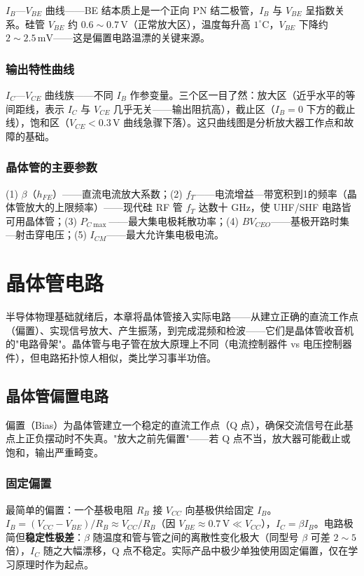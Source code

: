 \documentclass[12pt,UTF8]{ctexbook}
\begin{document}
$I_B$—$V_{BE}$ 曲线——BE 结本质上是一个正向 PN 结二极管，$I_B$ 与 $V_{BE}$ 呈指数关系。硅管 $V_{BE}$ 约 $0.6\sim0.7\,\mathrm{V}$（正常放大区），温度每升高 $1^\circ\mathrm{C}$，$V_{BE}$ 下降约 $2\sim2.5\,\mathrm{mV}$——这是偏置电路温漂的关键来源。

\subsection{输出特性曲线}

$I_C$—$V_{CE}$ 曲线族——不同 $I_B$ 作参变量。三个区一目了然：放大区（近乎水平的等间距线，表示 $I_C$ 与 $V_{CE}$ 几乎无关——输出阻抗高），截止区（$I_B=0$ 下方的截止线），饱和区（$V_{CE}<0.3\,\mathrm{V}$ 曲线急骤下落）。这只曲线图是分析放大器工作点和故障的基础。

\subsection{晶体管的主要参数}

(1) $\beta$（$h_{FE}$）——直流电流放大系数；(2) $f_T$——电流增益—带宽积到1的频率（晶体管放大的上限频率）——现代硅 RF 管 $f_T$ 达数十 GHz，使 UHF/SHF 电路皆可用晶体管；(3) $P_{C\max}$——最大集电极耗散功率；(4) $BV_{CEO}$——基极开路时集—射击穿电压；(5) $I_{CM}$——最大允许集电极电流。


\chapter{晶体管电路}
\label{chap:transistor_circuits}

半导体物理基础就绪后，本章将晶体管接入实际电路——从建立正确的直流工作点（偏置）、实现信号放大、产生振荡，到完成混频和检波——它们是晶体管收音机的"电路骨架"。晶体管与电子管在放大原理上不同（电流控制器件 vs 电压控制器件），但电路拓扑惊人相似，类比学习事半功倍。

\section{晶体管偏置电路}
\label{sec:transistor_bias}

偏置（Bias）为晶体管建立一个稳定的直流工作点（Q 点），确保交流信号在此基点上正负摆动时不失真。"放大之前先偏置"——若 Q 点不当，放大器可能截止或饱和，输出严重畸变。

\subsection{固定偏置}

最简单的偏置：一个基极电阻 $R_B$ 接 $V_{CC}$ 向基极供给固定 $I_B$。$I_B = (V_{CC}-V_{BE})/R_B \approx V_{CC}/R_B$（因 $V_{BE}\approx 0.7\,\mathrm{V} \ll V_{CC}$），$I_C = \beta I_B$。电路极简但\textbf{稳定性极差}：$\beta$ 随温度和管与管之间的离散性变化极大（同型号 $\beta$ 可差 $2\sim5$ 倍），$I_C$ 随之大幅漂移，Q 点不稳定。实际产品中极少单独使用固定偏置，仅在学习原理时作为起点。
\end{document}
